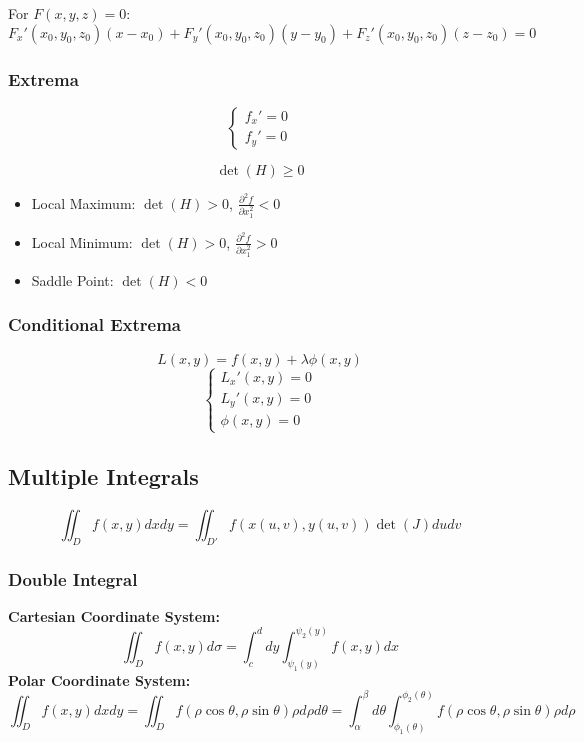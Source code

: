 \documentclass{article}
\begin{document}
For $F(x, y, z) = 0$:
\[
    F_x'(x_0, y_0, z_0)(x - x_0) + F_y'(x_0, y_0, z_0)(y - y_0) + F_z'(x_0, y_0, z_0)(z - z_0) = 0
\]

\subsubsection{Extrema}

\[
    \begin{cases}
        f_x' = 0 \\
        f_y' = 0
    \end{cases}
\]

\[
    \det(H) \geq 0
\]

\begin{itemize}
    \item Local Maximum: $\det(H) > 0$, $\frac{\partial^2 f}{\partial x_1^2} < 0$
    \item Local Minimum: $\det(H) > 0$, $\frac{\partial^2 f}{\partial x_1^2} > 0$
    \item Saddle Point: $\det(H) < 0$
\end{itemize}

\subsubsection{Conditional Extrema}

\[
    L(x, y) = f(x, y) + \lambda \phi(x, y)
\]
\[
    \begin{cases}
        L_x'(x, y) = 0 \\
        L_y'(x, y) = 0 \\
        \phi(x, y) = 0
    \end{cases}
\]

\subsection{Multiple Integrals}

\[
    \iint_D f(x, y) dx dy = \iint_{D'} f(x(u, v), y(u, v)) \det(J) du dv
\]

\subsubsection{Double Integral}

\textbf{Cartesian Coordinate System:}
\[
    \iint_D f(x, y) d\sigma = \int_c^d dy \int_{\psi_1(y)}^{\psi_2(y)} f(x, y) dx
\]
\textbf{Polar Coordinate System:}
\[
    \iint_D f(x, y) dx dy = \iint_D f(\rho \cos \theta, \rho \sin \theta) \rho d\rho d\theta = \int_\alpha^\beta d\theta \int_{\phi_1(\theta)}^{\phi_2(\theta)} f(\rho \cos \theta, \rho \sin \theta) \rho d\rho
\]
\end{document}
